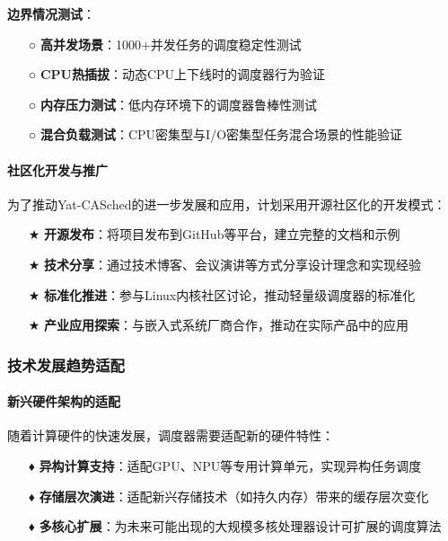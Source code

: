\textbf{边界情况测试}：
\begin{itemize}
    \item[○] \textbf{高并发场景}：1000+并发任务的调度稳定性测试
    \item[○] \textbf{CPU热插拔}：动态CPU上下线时的调度器行为验证
    \item[○] \textbf{内存压力测试}：低内存环境下的调度器鲁棒性测试
    \item[○] \textbf{混合负载测试}：CPU密集型与I/O密集型任务混合场景的性能验证
\end{itemize}

\paragraph{社区化开发与推广}

为了推动Yat-CASched的进一步发展和应用，计划采用开源社区化的开发模式：

\begin{itemize}
    \item[★] \textbf{开源发布}：将项目发布到GitHub等平台，建立完整的文档和示例
    \item[★] \textbf{技术分享}：通过技术博客、会议演讲等方式分享设计理念和实现经验
    \item[★] \textbf{标准化推进}：参与Linux内核社区讨论，推动轻量级调度器的标准化
    \item[★] \textbf{产业应用探索}：与嵌入式系统厂商合作，推动在实际产品中的应用
\end{itemize}

\subsubsection{技术发展趋势适配}

\paragraph{新兴硬件架构的适配}

随着计算硬件的快速发展，调度器需要适配新的硬件特性：

\begin{itemize}
    \item[♦] \textbf{异构计算支持}：适配GPU、NPU等专用计算单元，实现异构任务调度
    \item[♦] \textbf{存储层次演进}：适配新兴存储技术（如持久内存）带来的缓存层次变化
    \item[♦] \textbf{多核心扩展}：为未来可能出现的大规模多核处理器设计可扩展的调度算法
\end{itemize}


